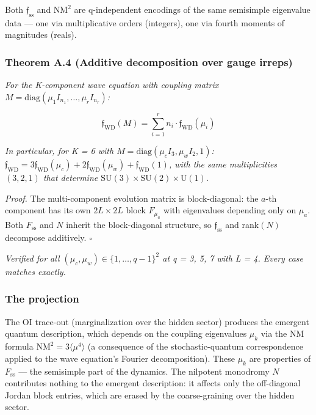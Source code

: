 \documentclass[
]{article}
\begin{document}
Both \(\mathfrak{f}_{\mathrm{ss}}\) and \(\mathrm{NM}^2\) are
q-independent encodings of the same semisimple eigenvalue data --- one
via multiplicative orders (integers), one via fourth moments of
magnitudes (reals).

\hypertarget{theorem-a.4-additive-decomposition-over-gauge-irreps}{%
\subsubsection{Theorem A.4 (Additive decomposition over gauge
irreps)}\label{theorem-a.4-additive-decomposition-over-gauge-irreps}}

\emph{For the K-component wave equation with coupling matrix
\(M = \mathrm{diag}(\mu_1 I_{n_1}, \ldots, \mu_r I_{n_r})\):}

\[\mathfrak{f}_{\mathrm{WD}}(M) = \sum_{i=1}^{r} n_i \cdot \mathfrak{f}_{\mathrm{WD}}(\mu_i)\]

\emph{In particular, for K = 6 with
\(M = \mathrm{diag}(\mu_c I_3, \mu_w I_2, 1)\):
\(\mathfrak{f}_{\mathrm{WD}} = 3\mathfrak{f}_{\mathrm{WD}}(\mu_c) + 2\mathfrak{f}_{\mathrm{WD}}(\mu_w) + \mathfrak{f}_{\mathrm{WD}}(1)\),
with the same multiplicities \((3, 2, 1)\) that determine
\(\mathrm{SU}(3) \times \mathrm{SU}(2) \times \mathrm{U}(1)\).}

\emph{Proof.} The multi-component evolution matrix is block-diagonal:
the \(a\)-th component has its own \(2L \times 2L\) block \(F_{\mu_a}\)
with eigenvalues depending only on \(\mu_a\). Both \(F_{\mathrm{ss}}\)
and \(N\) inherit the block-diagonal structure, so
\(\mathfrak{f}_{\mathrm{ss}}\) and rank\((N)\) decompose additively.
\(\square\)

\emph{Verified for all \((\mu_c, \mu_w) \in \{1, \ldots, q-1\}^2\) at q
= 3, 5, 7 with L = 4. Every case matches exactly.}

\hypertarget{the-projection}{%
\subsubsection{The projection}\label{the-projection}}

The OI trace-out (marginalization over the hidden sector) produces the
emergent quantum description, which depends on the coupling eigenvalues
\(\mu_k\) via the NM formula \(\mathrm{NM}^2 = 3\langle\mu^4\rangle\) (a
consequence of the stochastic-quantum correspondence applied to the wave
equation's Fourier decomposition). These \(\mu_k\) are properties of
\(F_{\mathrm{ss}}\) --- the semisimple part of the dynamics. The
nilpotent monodromy \(N\) contributes nothing to the emergent
description: it affects only the off-diagonal Jordan block entries,
which are erased by the coarse-graining over the hidden sector.
\end{document}
